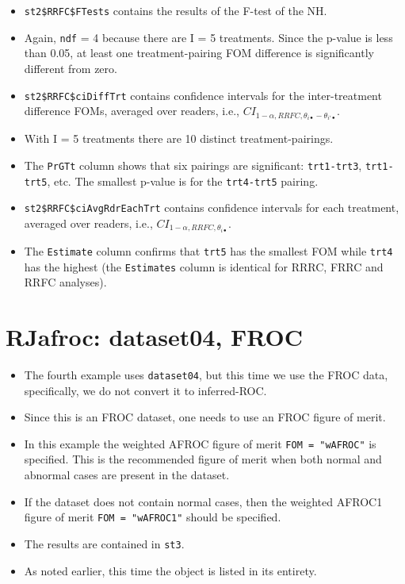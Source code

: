 \documentclass[
]{book}
\providecommand{\tightlist}{%
  \setlength{\itemsep}{0pt}\setlength{\parskip}{0pt}}
\begin{document}
\begin{itemize}
\item
  \texttt{st2\$RRFC\$FTests} contains the results of the F-test of the NH.
\item
  Again, \texttt{ndf} = 4 because there are I = 5 treatments. Since the p-value is less than 0.05, at least one treatment-pairing FOM difference is significantly different from zero.
\item
  \texttt{st2\$RRFC\$ciDiffTrt} contains confidence intervals for the inter-treatment difference FOMs, averaged over readers, i.e., \(CI_{1-\alpha,RRFC,\theta_{i \bullet} - \theta_{i' \bullet}}\).
\item
  With I = 5 treatments there are 10 distinct treatment-pairings.
\item
  The \texttt{PrGTt} column shows that six pairings are significant: \texttt{trt1-trt3}, \texttt{trt1-trt5}, etc. The smallest p-value is for the \texttt{trt4-trt5} pairing.
\item
  \texttt{st2\$RRFC\$ciAvgRdrEachTrt} contains confidence intervals for each treatment, averaged over readers, i.e., \(CI_{1-\alpha,RRFC,\theta_{i \bullet}}\).
\item
  The \texttt{Estimate} column confirms that \texttt{trt5} has the smallest FOM while \texttt{trt4} has the highest (the \texttt{Estimates} column is identical for RRRC, FRRC and RRFC analyses).
\end{itemize}

\hypertarget{or-applications-dataset04-FROC-RJafroc}{%
\section{RJafroc: dataset04, FROC}\label{or-applications-dataset04-FROC-RJafroc}}

\begin{itemize}
\tightlist
\item
  The fourth example uses \texttt{dataset04}, but this time we use the FROC data, specifically, we do not convert it to inferred-ROC.
\item
  Since this is an FROC dataset, one needs to use an FROC figure of merit.
\item
  In this example the weighted AFROC figure of merit \texttt{FOM\ =\ "wAFROC"} is specified. This is the recommended figure of merit when both normal and abnormal cases are present in the dataset.
\item
  If the dataset does not contain normal cases, then the weighted AFROC1 figure of merit \texttt{FOM\ =\ "wAFROC1"} should be specified.
\item
  The results are contained in \texttt{st3}.
\item
  As noted earlier, this time the object is listed in its entirety.
\end{itemize}
\end{document}
